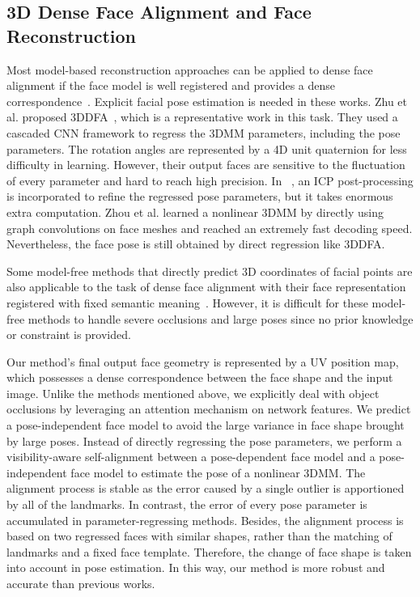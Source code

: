 \documentclass[journal]{IEEEtran}
\begin{document}
	\subsection{3D Dense Face Alignment and Face Reconstruction}
	Most model-based reconstruction approaches can be applied to dense face alignment if the face model is well registered and provides a dense correspondence~\cite{defa_2017_ICCV,Nonlinear_3DMM,MMFace2019_CVPR}. Explicit facial pose estimation is needed in these works.
	Zhu et al. proposed 3DDFA~\cite{3DDFA}, which is a representative work in this task. They used a cascaded CNN framework to regress the 3DMM parameters, including the pose parameters. The rotation angles are represented by a 4D unit quaternion for less difficulty in learning. However, their output faces are sensitive to the fluctuation of every parameter and hard to reach high precision. In ~\cite{MMFace2019_CVPR}, an ICP post-processing is incorporated to refine the regressed pose parameters, but it takes enormous extra computation. Zhou et al. learned a nonlinear 3DMM by directly using graph convolutions on face meshes and reached an extremely fast decoding speed. Nevertheless, the face pose is still obtained by direct regression like 3DDFA.
	
	Some model-free methods that directly predict 3D coordinates of facial points are also applicable to the task of dense face alignment with their face representation registered with fixed semantic meaning~\cite{PRN,VRN}. However, it is difficult for these model-free methods to handle severe occlusions and large poses since no prior knowledge or constraint is provided.
	
	Our method's final output face geometry is represented by a UV position map, which possesses a dense correspondence between the face shape and the input image.
	Unlike the methods mentioned above, we explicitly deal with object occlusions by leveraging an attention mechanism on network features. We predict a pose-independent face model to avoid the large variance in face shape brought by large poses. Instead of directly regressing the pose parameters, we perform a visibility-aware self-alignment between a pose-dependent face model and a pose-independent face model to estimate the pose of a nonlinear 3DMM. The alignment process is stable as the error caused by a single outlier is apportioned by all of the landmarks. In contrast, the error of every pose parameter is accumulated in parameter-regressing methods. Besides, the alignment process is based on two regressed faces with similar shapes, rather than the matching of landmarks and a fixed face template. Therefore, the change of face shape is taken into account in pose estimation. In this way, our method is more robust and accurate than previous works.
	
\end{document}
